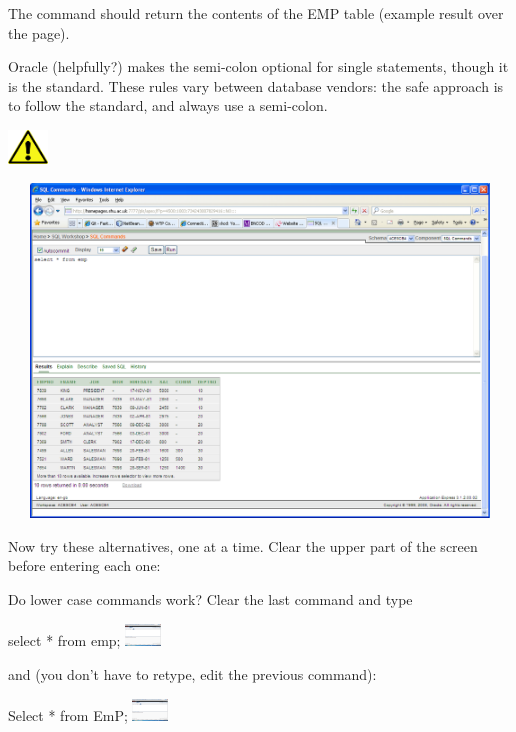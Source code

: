 The command should return the contents of the EMP table (example result over the page).

Oracle (helpfully?) makes the semi-colon optional for single statements, though it is the standard. These rules vary between database vendors: the {\textquotedbl}safe{\textquotedbl} approach is to follow the standard, and always use a semi-colon.

\begin{center}
  
\includegraphics[width=1.058cm,height=0.903cm]{images/img (2).png}

\end{center}
   
\includegraphics[width=14.785cm,height=8.871cm]{images/img (10).png}
 

Now try these alternatives, one at a time. Clear the upper part of the screen before entering each one:

Do lower case commands work? Clear the last command and type

select  *  from emp; 
\includegraphics[width=0.947cm,height=0.607cm]{images/img (9).png}
 

and (you don't have to retype, edit the previous command):

Select  *  from EmP; 
\includegraphics[width=0.947cm,height=0.607cm]{images/img (9).png}
 

